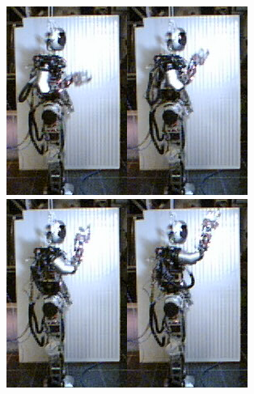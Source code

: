 \begin{figure}[ht]
\includegraphics[width=0.25\columnwidth]{./pix/slowMotion/1.png}\includegraphics[width=0.25\columnwidth]{./pix/slowMotion/3.png}\includegraphics[width=0.25\columnwidth]{./pix/slowMotion/5.png}\includegraphics[width=0.25\columnwidth]{./pix/slowMotion/7.png}

\end{figure}

